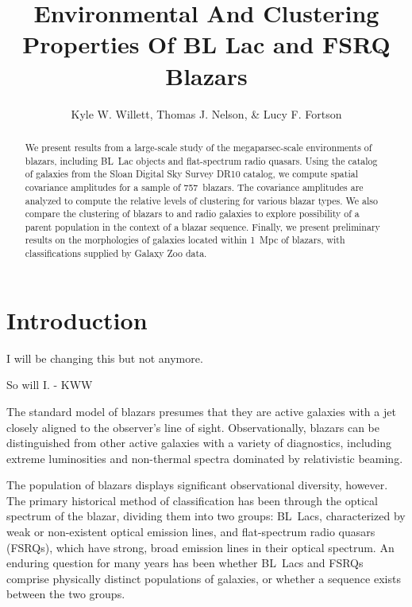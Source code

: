 \documentclass{emulateapj}
\begin{document}
\title{Environmental And Clustering Properties Of BL Lac and FSRQ Blazars}

\author{Kyle W. Willett, Thomas J. Nelson, \& Lucy F. Fortson}


\begin{abstract}
We present results from a large-scale study of the megaparsec-scale environments of blazars, including BL~Lac objects and flat-spectrum radio quasars. Using the catalog of galaxies from the Sloan Digital Sky Survey DR10 catalog, we compute spatial covariance amplitudes for a sample of 757~blazars. The covariance amplitudes are analyzed to compute the relative levels of clustering for various blazar types. We also compare the clustering of blazars to \FRI{} and \FRII{} radio galaxies to explore possibility of a parent population in the context of a blazar sequence. Finally, we present preliminary results on the morphologies of galaxies located within 1~Mpc of blazars, with classifications supplied by Galaxy Zoo data.
\end{abstract}


\section{Introduction} \label{sec-intro}


I will be changing this but not anymore.

So will I. - KWW

The standard model of blazars presumes that they are active galaxies with a jet closely aligned to the observer's line of sight. Observationally, blazars can be distinguished from other active galaxies with a variety of diagnostics, including extreme luminosities and non-thermal spectra dominated by relativistic beaming. 

The population of blazars displays significant observational diversity, however. The primary historical method of classification has been through the optical spectrum of the blazar, dividing them into two groups: BL~Lacs, characterized by weak or non-existent optical emission lines, and flat-spectrum radio quasars (FSRQs), which have strong, broad emission lines in their optical spectrum. An enduring question for many years has been whether BL~Lacs and FSRQs comprise physically distinct populations of galaxies, or whether a sequence exists between the two groups. 
\end{document}
